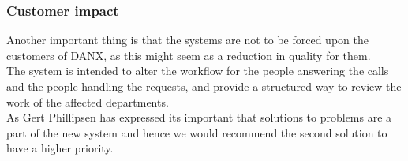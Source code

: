 \subsubsection{Customer impact}
Another important thing is that the systems are not to be forced upon the customers of DANX, as this might seem as a reduction in quality for them.\\
The system is intended to alter the workflow for the people answering the calls and the people handling the requests, and provide a structured way to review the work of the affected departments.\\
As Gert Phillipsen has expressed its important that solutions to problems are a part of the new system and hence we would recommend the second solution to have a higher priority.\cite{gert003}

